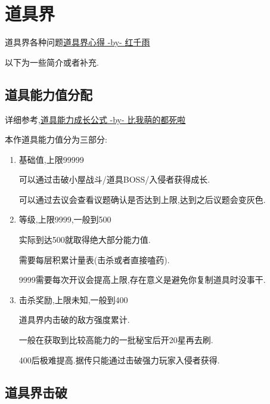 	\newpage

	\section{道具界}

	道具界各种问题\href{http://tieba.baidu.com/p/3730196003}{道具界心得 -by- 红千雨}

	以下为一些简介或者补充.

	\subsection{道具能力值分配}
	
	详细参考,\href{http://tieba.baidu.com/f?kz=3834692385}{道具能力成长公式 -by- 比我萌的都死啦}

	本作道具能力值分为三部分:

	\begin{enumerate}

		\item 
		基础值,上限99999

		可以通过击破小屋战斗/道具BOSS/入侵者获得成长.

		可以通过去议会查看议题确认是否达到上限,达到之后议题会变灰色.

		\item
		等级,上限9999,一般到500

		实际到达500就取得绝大部分能力值.

		需要每层积累计量表(击杀或者直接嗑药).

		9999需要每次开议会提高上限,存在意义是避免你复制道具时没事干.

		\item
		击杀奖励,上限未知,一般到400

		道具界内击破的敌方强度累计.

		一般在获取到比较高能力的一批秘宝后开20星再去刷.

		400后极难提高.据传只能通过击破强力玩家入侵者获得.

	\end{enumerate}
	
	\newpage

	\subsection{道具界击破}

